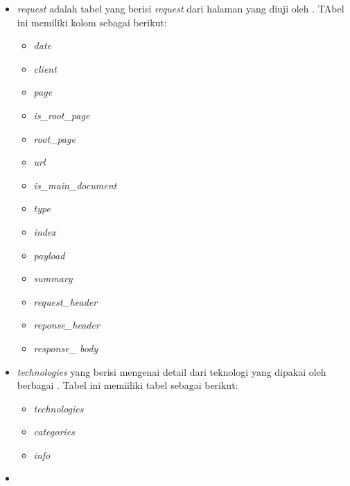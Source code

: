 \begin{itemize}
    \item \textit{request} adalah tabel yang berisi \textit{request} dari halaman yang diuji oleh \http. TAbel ini memiliki kolom sebagai berikut:
    \begin{itemize}
         \item \textit{date}
        \item \textit{client}
        \item \textit{page}
        \item \textit{is\_root\_page}
        \item \textit{root\_page}
        \item \textit{url}
        \item \textit{is\_main\_document}
        \item \textit{type}
        \item \textit{index}
        \item \textit{payload}
        \item \textit{summary}
        \item \textit{request\_header}
        \item \textit{reponse\_header}
        \item \textit{response\_ body}
    \end{itemize}

    
    \item \textit{technologies} yang berisi mengenai detail dari teknologi yang dipakai oleh berbagai \web. Tabel ini memiiliki tabel sebagai berikut:
     \begin{itemize}
        \item \textit{technologies}
        \item \textit{categories}
        \item \textit{info}
    \end{itemize}

    \item \textit{}
\end{itemize}


